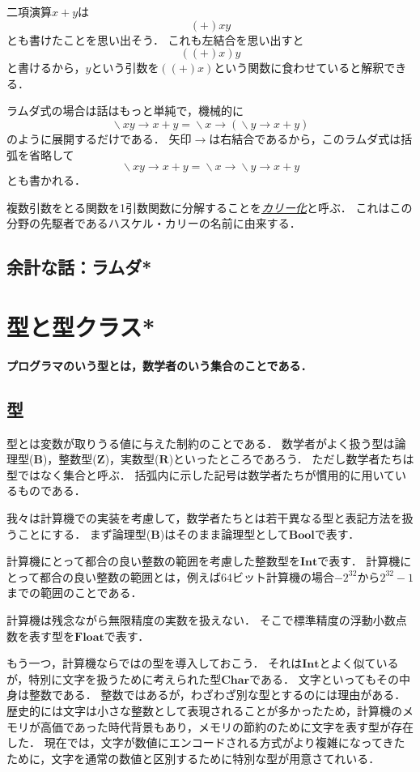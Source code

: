 \documentclass[twocolumn]{jsbook}
\newcommand{\keyword}[1]{\underline{\emph{#1}}}
\newenvironment{leader}{\begingroup\bf}{\endgroup}
\newcommand{\hsklType}[1]{\textbf{#1}}
\newcommand{\hsklBool}{\hsklType{Bool}}
\newcommand{\hsklChar}{\hsklType{Char}}
\newcommand{\hsklInt}{\hsklType{Int}}
\newcommand{\hsklFloat}{\hsklType{Float}}
\DeclareMathOperator{\mathLambda}{\backslash}
\newcommand{\mathLambdaArrow}{\rightarrow}
\newcommand{\mathSet}[1]{\mathbf{#1}}
\newcommand{\mathLambdaExpression}[2]{\mathLambda#1\mathLambdaArrow#2}
\begin{document}
二項演算$x+y$は$$(+)xy$$とも書けたことを思い出そう．
これも左結合を思い出すと$$((+)x)y$$と書けるから，$y$という引数を$((+)x)$という関数に食わせていると解釈できる．

ラムダ式の場合は話はもっと単純で，機械的に$$\mathLambdaExpression{xy}{x+y}=\mathLambdaExpression{x}{(\mathLambdaExpression{y}{x+y})}$$のように展開するだけである．
矢印$\mathLambdaArrow$は右結合であるから，このラムダ式は括弧を省略して$$\mathLambdaExpression{xy}{x+y}=\mathLambdaExpression{x}{\mathLambdaExpression{y}{x+y}}$$とも書かれる．

複数引数をとる関数を1引数関数に分解することを\keyword{カリー化}と呼ぶ．
これはこの分野の先駆者であるハスケル・カリーの名前に由来する．

\section*{余計な話：ラムダ*}


\chapter{型と型クラス*}

\begin{leader}
プログラマのいう型とは，数学者のいう集合のことである．
\end{leader}


\section{型}

型とは変数が取りうる値に与えた制約のことである．
数学者がよく扱う型は論理型($\mathSet{B}$)，整数型($\mathSet{Z}$)，実数型($\mathSet{R}$)といったところであろう．
ただし数学者たちは型ではなく集合と呼ぶ．
括弧内に示した記号は数学者たちが慣用的に用いているものである．

我々は計算機での実装を考慮して，数学者たちとは若干異なる型と表記方法を扱うことにする．
まず論理型($\mathSet{B}$)はそのまま論理型として$\hsklBool$で表す．

計算機にとって都合の良い整数の範囲を考慮した整数型を$\hsklInt$で表す．
計算機にとって都合の良い整数の範囲とは，例えば64ビット計算機の場合$-2^{32}$から$2^{32}-1$までの範囲のことである．

計算機は残念ながら無限精度の実数を扱えない．
そこで標準精度の浮動小数点数を表す型を$\hsklFloat$で表す．

もう一つ，計算機ならではの型を導入しておこう．
それは$\hsklInt$とよく似ているが，特別に文字を扱うために考えられた型$\hsklChar$である．
文字といってもその中身は整数である．
整数ではあるが，わざわざ別な型とするのには理由がある．
歴史的には文字は小さな整数として表現されることが多かったため，計算機のメモリが高価であった時代背景もあり，メモリの節約のために文字を表す型が存在した．
現在では，文字が数値にエンコードされる方式がより複雑になってきたために，文字を通常の数値と区別するために特別な型が用意さてれいる．
\end{document}

